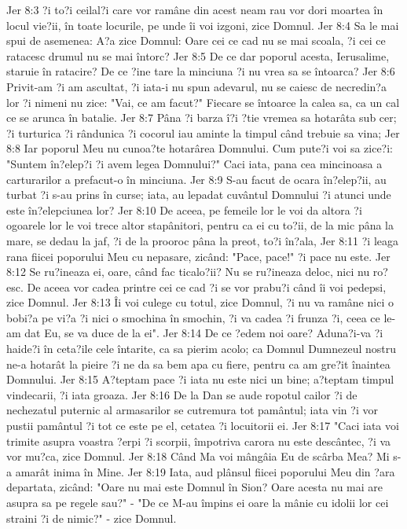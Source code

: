 Jer 8:3  ?i to?i ceilal?i care vor ramâne din acest neam rau vor dori moartea în locul vie?ii, în toate locurile, pe unde îi voi izgoni, zice Domnul.
Jer 8:4  Sa le mai spui de asemenea: A?a zice Domnul: Oare cei ce cad nu se mai scoala, ?i cei ce ratacesc drumul nu se mai întorc?
Jer 8:5  De ce dar poporul acesta, Ierusalime, staruie în ratacire? De ce ?ine tare la minciuna ?i nu vrea sa se întoarca?
Jer 8:6  Privit-am ?i am ascultat, ?i iata-i nu spun adevarul, nu se caiesc de necredin?a lor ?i nimeni nu zice: "Vai, ce am facut?" Fiecare se întoarce la calea sa, ca un cal ce se arunca în batalie.
Jer 8:7  Pâna ?i barza î?i ?tie vremea sa hotarâta sub cer; ?i turturica ?i rândunica ?i cocorul iau aminte la timpul când trebuie sa vina;
Jer 8:8  Iar poporul Meu nu cunoa?te hotarârea Domnului. Cum pute?i voi sa zice?i: "Suntem în?elep?i ?i avem legea Domnului?" Caci iata, pana cea mincinoasa a carturarilor a prefacut-o în minciuna.
Jer 8:9  S-au facut de ocara în?elep?ii, au turbat ?i s-au prins în curse; iata, au lepadat cuvântul Domnului ?i atunci unde este în?elepciunea lor?
Jer 8:10  De aceea, pe femeile lor le voi da altora ?i ogoarele lor le voi trece altor stapânitori, pentru ca ei cu to?ii, de la mic pâna la mare, se dedau la jaf, ?i de la prooroc pâna la preot, to?i în?ala,
Jer 8:11  ?i leaga rana fiicei poporului Meu cu nepasare, zicând: "Pace, pace!" ?i pace nu este.
Jer 8:12  Se ru?ineaza ei, oare, când fac ticalo?ii? Nu se ru?ineaza deloc, nici nu ro?esc. De aceea vor cadea printre cei ce cad ?i se vor prabu?i când îi voi pedepsi, zice Domnul.
Jer 8:13  Îi voi culege cu totul, zice Domnul, ?i nu va ramâne nici o bobi?a pe vi?a ?i nici o smochina în smochin, ?i va cadea ?i frunza ?i, ceea ce le-am dat Eu, se va duce de la ei".
Jer 8:14  De ce ?edem noi oare? Aduna?i-va ?i haide?i în ceta?ile cele întarite, ca sa pierim acolo; ca Domnul Dumnezeul nostru ne-a hotarât la pieire ?i ne da sa bem apa cu fiere, pentru ca am gre?it înaintea Domnului.
Jer 8:15  A?teptam pace ?i iata nu este nici un bine; a?teptam timpul vindecarii, ?i iata groaza.
Jer 8:16  De la Dan se aude ropotul cailor ?i de nechezatul puternic al armasarilor se cutremura tot pamântul; iata vin ?i vor pustii pamântul ?i tot ce este pe el, cetatea ?i locuitorii ei.
Jer 8:17  "Caci iata voi trimite asupra voastra ?erpi ?i scorpii, împotriva carora nu este descântec, ?i va vor mu?ca, zice Domnul.
Jer 8:18  Când Ma voi mângâia Eu de scârba Mea? Mi s-a amarât inima în Mine.
Jer 8:19  Iata, aud plânsul fiicei poporului Meu din ?ara departata, zicând: "Oare nu mai este Domnul în Sion? Oare acesta nu mai are asupra sa pe regele sau?" - "De ce M-au împins ei oare la mânie cu idolii lor cei straini ?i de nimic?" - zice Domnul.
